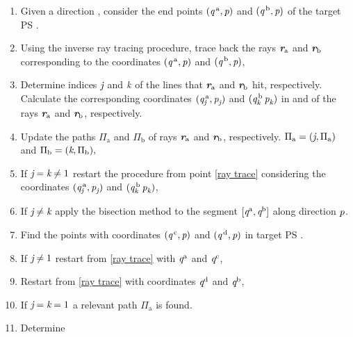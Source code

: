 \begin{enumerate}
\item Given a direction , consider the end points $(\textit{q}^{\,\textrm{a}}, \textit{p})$ and $(\textit{q}^{\,\textrm{b}}, \textit{p})$ of the target PS .
\item \label{ray trace} Using the inverse ray tracing procedure, trace back the rays $\textit{\textbf{r}}_{\textrm{a}}$ and $\textit{\textbf{r}}_\textrm{b}$ corresponding to the coordinates  $(\textit{q}^{\,\textrm{a}}, \textit{p})$ and $ (\textit{q}^{\,\textrm{b}}, \textit{p})$,
\item Determine indices $\textit{j}$ and $\textit{k}$ of the lines that  $\textit{\textbf{r}}_{\textrm{a}}$ and $\textit{\textbf{r}}_{\textrm{b}}$  hit, respectively.\\
Calculate the corresponding coordinates $(\textit{q}^{\,\textrm{a}}_{\textit{j}}, \textit{p}_{\textit{j}})$ and $(\textit{q}^{\,\textrm{b}}_{\textit{k}}\, \textit{p}_{\textit{k}})$  in  and  of the rays $\textit{\textbf{r}}_{\textrm{a}}$ and $\textit{\textbf{r}}_{\textrm{b}}$, respectively.
\item Update the paths $\Pi_\textrm{a}$ and $\Pi_\textrm{b}$ of rays $\textit{\textbf{r}}_\textrm{a}$ and $\textit{\textbf{r}}_\textrm{b}$, respectively.  $\Pi_\textrm{a} = (\textit{j}, \Pi_{\textrm{a}})$ and $\Pi_\textrm{b} = (\textit{k}, \Pi_\textrm{b}),$
\item If $\textit{j}=\textit{k} \neq 1$ restart the procedure from point \ref{ray trace} considering the coordinates  $(\textit{q}^{\,\textrm{a}}_{\textit{j}}, \textit{p}_{\textit{j}})$ and $(\textit{q}^{\,\textrm{b}}_{\textit{k}}\, \textit{p}_{\textit{k}})$,
\item If $\textit{j}\neq\textit{k}$ apply the bisection method to the segment $[\textit{q}^{\textrm{a}}, \textit{q}^{\textrm{b}}]$ along direction $\textit{p}$.
\item Find the points with coordinates $(\textit{q}^{\,\textrm{c}}, \textit{p})$ and $(\textit{q}^{\,\textrm{d}}, \textit{p})$ in target PS . 
\item If $\textit{j}\neq 1$ restart from \ref{ray trace} with $\textit{q}^{\textrm{a}}$ and $\textit{q}^{\textrm{c}}$,
\item Restart from \ref{ray trace} with coordinates $\textit{q}^{\textrm{d}}$ and $\textit{q}^{\textrm{b}}$,
\item If $\textit{j}=\textit{k}= 1$ a relevant path $\Pi_{\textrm{a}}$ is found. 
\item Determine 
\begin{equation*}

\end{equation*}
\end{enumerate}
